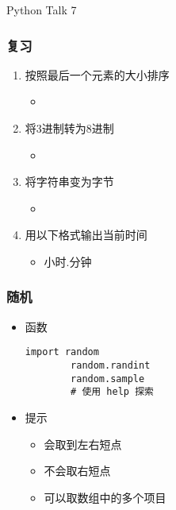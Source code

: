 



\PreFirstFrame
\begin{frame} [fragile]
	\centerline{\fontsize{42}{42}\selectfont Python Talk 7}
\end{frame}
\PostFirstFrame

\begin{frame} [fragile]
	\frametitle{复习}
	\linespread{1.25}
	\begin{enumerate}
	\item 按照最后一个元素的大小排序
		\begin{itemize}
		\item {}
		\end{itemize}
	\item 将3进制转为8进制
		\begin{itemize}
		\item {}
		\end{itemize}
	\item 将字符串变为字节
		\begin{itemize}
		\item {}
		\end{itemize}
	\item 用以下格式输出当前时间
		\begin{itemize}
		\item 小时.分钟
		\end{itemize}
	\end{enumerate}
\end{frame}

\begin{frame} [fragile]
	\frametitle{随机}
	\linespread{1.25}
	\begin{itemize}
	\item 函数
		\begin{lstlisting}[style=pythonstyle, gobble=8, texcl]
		import random
		random.randint
		random.sample
		# 使用 help 探索
		\end{lstlisting}
	\item 提示
		\begin{itemize}
		\item {} 会取到左右短点
		\item {} 不会取右短点
		\item {} 可以取数组中的多个项目
		\end{itemize}
	\end{itemize}
\end{frame}

